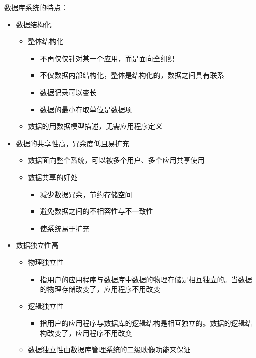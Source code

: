 数据库系统的特点：
\begin{itemize}
    \item 数据结构化
    \begin{itemize}
        \item 整体结构化
        \begin{itemize}
            \item 不再仅仅针对某一个应用，而是面向全组织
            \item 不仅数据内部结构化，整体是结构化的，数据之间具有联系
            \item 数据记录可以变长
            \item 数据的最小存取单位是数据项
        \end{itemize}
        \item 数据的用数据模型描述，无需应用程序定义
    \end{itemize}
    \item 数据的共享性高，冗余度低且易扩充
    \begin{itemize}
        \item 数据面向整个系统，可以被多个用户、多个应用共享使用
        \item 数据共享的好处
        \begin{itemize}
            \item 减少数据冗余，节约存储空间
            \item 避免数据之间的不相容性与不一致性 
            \item 使系统易于扩充
        \end{itemize}
    \end{itemize}
    \item 数据独立性高
    \begin{itemize}
        \item 物理独立性
        \begin{itemize}
            \item 指用户的应用程序与数据库中数据的物理存储是相互独立的。当数据的物理存储改变了，应用程序不用改变
        \end{itemize}
        \item 逻辑独立性
        \begin{itemize}
            \item 指用户的应用程序与数据库的逻辑结构是相互独立的。数据的逻辑结构改变了，应用程序不用改变
        \end{itemize}
        \item 数据独立性由数据库管理系统的二级映像功能来保证
        \begin{itemize}

\end{itemize}
\end{itemize}
\end{itemize}
